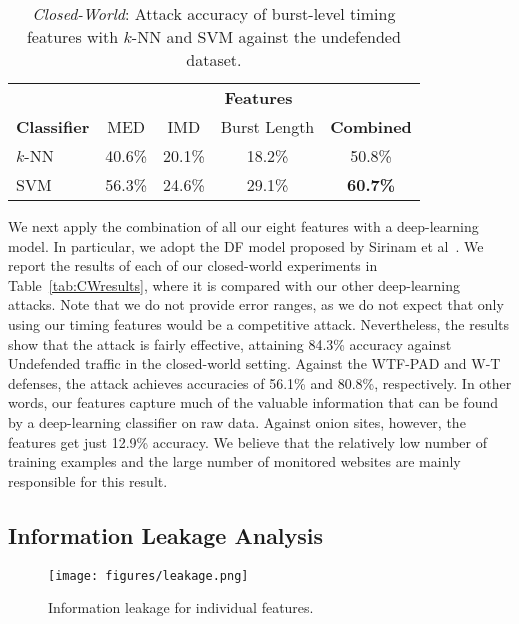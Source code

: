 \documentclass[USenglish,oneside,twocolumn]{article}
\begin{document}
\begin{table}[t]
\renewcommand{\arraystretch}{1.15}
\begin{center}
    \caption{\textit{Closed-World}: Attack accuracy of burst-level timing features with $k$-NN and SVM against the undefended dataset.}\vskip -0.05cm
    \label{tab:undefendedTor}
    \begin{tabular}{l c c c c}
      &  \multicolumn{4}{c}{\textbf{Features}}\\ \cline{2-5}
      \textbf{Classifier} & MED & IMD & Burst Length & \textbf{Combined} \\
        \hline 
      $k$-NN~\cite{wang2014effective} & 40.6\% & 20.1\% & 18.2\% & 50.8\% \\
      SVM~\cite{panchenko2016website} & 56.3\% & 24.6\% & 29.1\% & \textbf{60.7\%} \\
 		\hline
    \end{tabular}\vskip -0.6cm
  \end{center}
\end{table} 
We next apply the combination of all our eight features with a deep-learning model. In particular, we adopt the DF model proposed by Sirinam et al~\cite{Sirinam2018}.
We report the results of each of our closed-world experiments in Table~\ref{tab:CWresults}, where it is compared with our other deep-learning attacks. Note that we do not provide error ranges, as we do not expect that only using our timing features would be a competitive attack.
Nevertheless, the results show that the attack is fairly effective, attaining 84.3\% accuracy against Undefended traffic in the closed-world setting. Against the WTF-PAD and W-T defenses, the attack achieves accuracies of 56.1\% and 80.8\%, respectively. In other words, our features capture much of the valuable information that can be found by a deep-learning classifier on raw data.
Against onion sites, however, the features get just 12.9\% accuracy. We believe that the relatively low number of training examples and the large number of monitored websites are mainly responsible for this result.







\subsection{Information Leakage Analysis}
\label{infor_leakage}

\begin{figure*}[!t]
  \texttt{[image: figures/leakage.png]}
  \caption{Information leakage for individual features.}
  \label{fig:infoleak}
\end{figure*}
\end{document}
